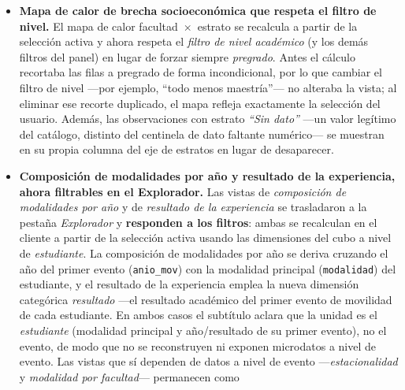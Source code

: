 \documentclass[12pt,a4paper]{article}
\begin{document}
\begin{itemize}[leftmargin=*]
{    facultad~$\times$~estrato} se recalculan en el cliente a partir de la selección
    activa, de modo que acompañan cualquier combinación de filtros. Para la matriz de
    oportunidad se descartan las facultades con menos de \textbf{50 estudiantes} en
    la selección ---para evitar tasas ruidosas de cohortes diminutas---, umbral que se
    omite cuando la selección total es pequeña (menos de 200 estudiantes) para no
    vaciar el gráfico; la línea de referencia de ``media'' pasa a ser la \textbf{tasa
    de la selección}, coherente con que el resto del tablero responde a los filtros.
    \item \textbf{Mapa de calor de brecha socioeconómica que respeta el filtro de
    nivel.} El mapa de calor facultad~$\times$~estrato se recalcula a partir de la
    selección activa y ahora respeta el \emph{filtro de nivel académico} (y los demás
    filtros del panel) en lugar de forzar siempre \emph{pregrado}. Antes el cálculo
    recortaba las filas a pregrado de forma incondicional, por lo que cambiar el
    filtro de nivel ---por ejemplo, ``todo menos maestría''--- no alteraba la vista;
    al eliminar ese recorte duplicado, el mapa refleja exactamente la selección del
    usuario. Además, las observaciones con estrato \emph{``Sin dato''} ---un valor
    legítimo del catálogo, distinto del centinela de dato faltante numérico--- se
    muestran en su propia columna del eje de estratos en lugar de desaparecer.
    \item \textbf{Composición de modalidades por año y resultado de la experiencia,
    ahora filtrables en el Explorador.} Las vistas de \emph{composición de
    modalidades por año} y de \emph{resultado de la experiencia} se trasladaron a la
    pestaña \emph{Explorador} y \textbf{responden a los filtros}: ambas se recalculan
    en el cliente a partir de la selección activa usando las dimensiones del cubo a
    nivel de \emph{estudiante}. La composición de modalidades por año se deriva
    cruzando el año del primer evento (\texttt{anio\_mov}) con la modalidad principal
    (\texttt{modalidad}) del estudiante, y el resultado de la experiencia emplea la
    nueva dimensión categórica \emph{resultado} ---el resultado académico del primer
    evento de movilidad de cada estudiante. En ambos casos el subtítulo aclara que la
    unidad es el \emph{estudiante} (modalidad principal y año/resultado de su primer
    evento), no el evento, de modo que no se reconstruyen ni exponen microdatos a
    nivel de evento. Las vistas que sí dependen de datos a nivel de evento
    ---\emph{estacionalidad} y \emph{modalidad por facultad}--- permanecen como

\end{itemize}
\end{document}
